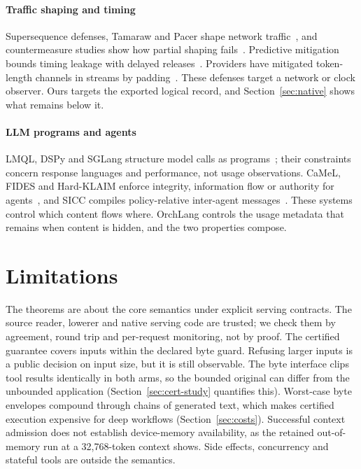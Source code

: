 \documentclass[preprint,12pt]{elsarticle}
\theoremstyle{definition}
\begin{document}
\paragraph{Traffic shaping and timing}
Supersequence defenses, Tamaraw and Pacer shape network
traffic~\cite{wang2014supersequence,cai2014tamaraw,mehta2022pacer}, and
countermeasure studies show how partial shaping
fails~\cite{dyer2012peekaboo}. Predictive mitigation bounds timing leakage with
delayed releases~\cite{askarov2010predictive,zhang2012timing}. Providers have
mitigated token-length channels in streams by padding~\cite{cloudflare2024padding,openai2026obfuscation}.
These defenses target a network or clock observer. Ours targets the exported
logical record, and Section~\ref{sec:native} shows what remains below it.

\paragraph{LLM programs and agents}
LMQL, DSPy and SGLang structure model calls as
programs~\cite{beurer2023lmql,khattab2024dspy,zheng2024sglang}; their constraints
concern response languages and performance, not usage observations. CaMeL, FIDES
and Hard-KLAIM enforce integrity, information flow or authority for
agents~\cite{debenedetti2025camel,costa2025fides,aldinucci2026hardklaim}, and
SICC compiles policy-relative inter-agent messages~\cite{xu2026sicc}. These systems
control which content flows where. OrchLang controls the usage metadata that
remains when content is hidden, and the two properties compose.

\section{Limitations}\label{sec:limits}

The theorems are about the core semantics under explicit serving contracts. The
source reader, lowerer and native serving code are trusted; we check them by
agreement, round trip and per-request monitoring, not by proof. The certified
guarantee covers inputs within the declared byte guard. Refusing larger inputs is
a public decision on input size, but it is still observable. The byte interface
clips tool results identically in both arms, so the bounded original can differ
from the unbounded application (Section~\ref{sec:cert-study} quantifies this).
Worst-case byte envelopes compound through chains of generated text, which makes
certified execution expensive for deep workflows (Section~\ref{sec:costs}).
Successful context admission does not establish device-memory availability, as
the retained out-of-memory run at a 32,768-token context shows. Side effects,
concurrency and stateful tools are outside the semantics.
\end{document}
